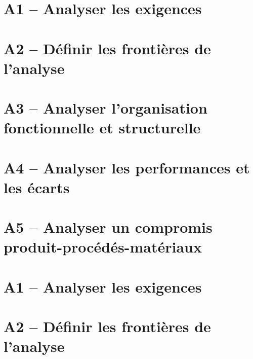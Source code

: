 \proffalse
\section{A1 -- Analyser les exigences}
\begin{multicols}{2}
\end{multicols}

\section{A2 -- Définir les frontières de l'analyse}
\begin{multicols}{2}
\end{multicols}

\section{A3 -- Analyser l'organisation fonctionnelle et structurelle}

\begin{multicols}{2}

\end{multicols}

\begin{multicols}{2}

\end{multicols}

\section{A4 -- Analyser les performances et les écarts}
\begin{multicols}{2}
\end{multicols}

\section{A5 -- Analyser un compromis produit-procédés-matériaux}
\begin{multicols}{2}
\end{multicols}


\proftrue
\newpage
\section{A1 -- Analyser les exigences}

\section{A2 -- Définir les frontières de l'analyse}

